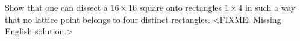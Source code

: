 \problem
Show that one can dissect a $16 \times 16$ square onto rectangles $1 \times 4$
in such a way that no lattice point belongs to four distinct rectangles.
\solution
<FIXME: Missing English solution.>
\endproblem
